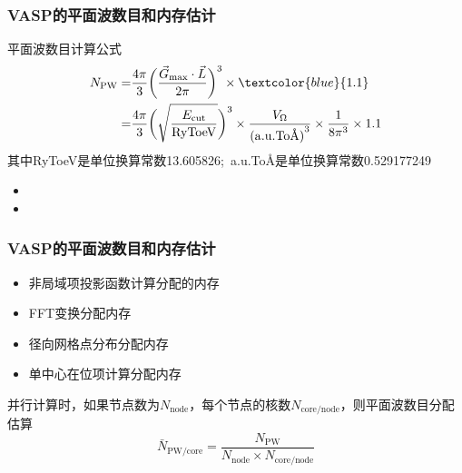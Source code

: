 {\frame
{
	\frametitle{\textrm{VASP}的平面波数目和内存估计}
	平面波数目计算公式
	\begin{displaymath}
		\begin{aligned}
			N_{\mathrm{PW}}=&\dfrac{4\pi}3\bigg(\dfrac{\vec G_{\mathrm{max}}\cdot\vec L}{2\pi}\bigg)^3\times\textcolor{blue}{1.1}\\
			=&\dfrac{4\pi}3\bigg(\sqrt{\dfrac{E_{\mathrm{cut}}}{\mathrm{RyToeV}}}\bigg)^3\times\dfrac{V_{\Omega}}{\mathrm{(a.u.To}\mbox{\textrm{\AA)}}^3}\times\dfrac1{8\pi^3}\times1.1
		\end{aligned}
	\end{displaymath}
	{\tiny 其中\textrm{RyToeV}是单位换算常数\textrm{13.605826};~\textrm{a.u.To\AA}是单位换算常数\textrm{0.529177249}}
	\begin{itemize}
		\item {\fontsize{9.2pt}{6.2pt}}
		\item {\fontsize{9.2pt}{6.2pt}}
	\end{itemize}
}

\frame
{
	\frametitle{\textrm{VASP}的平面波数目和内存估计}
	\begin{itemize}
		\item 非局域项投影函数计算分配的内存
		\item \textrm{FFT}变换分配内存
		\item 径向网格点分布分配内存
		\item 单中心在位项计算分配内存
	\end{itemize}
	并行计算时，如果节点数为$N_{\mathrm{node}}$，每个节点的核数$N_{\mathrm{core/node}}$，则平面波数目分配估算
	\begin{displaymath}
		\bar{N}_{\mathrm{PW/core}}=\dfrac{N_{\mathrm{PW}}}{N_{\mathrm{node}}\times N_{\mathrm{core/node}}}
	\end{displaymath}

}}
